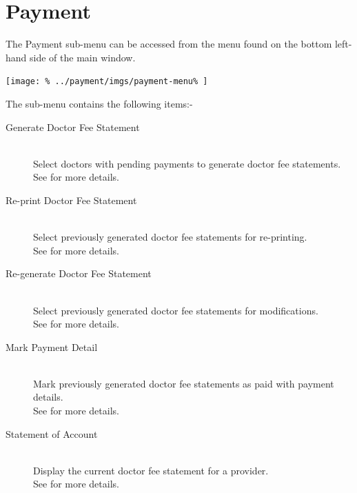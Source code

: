 \documentclass[../main/main]{subfiles}
\begin{document}
\newpage
\chapter{Payment}
The Payment sub-menu can be accessed from the menu found on the bottom
left-hand side of the main window.

\texttt{[image: \%
  ../payment/imgs/payment-menu\%
]}

The sub-menu contains the following items:-
\begin{description}
\item[Generate Doctor Fee Statement] \hfill \\
Select doctors with pending payments to generate doctor fee statements.\\
See  for more details.
\item[Re-print Doctor Fee Statement] \hfill \\
Select previously generated doctor fee statements for re-printing.\\
See  for more details.
\item[Re-generate Doctor Fee Statement] \hfill \\
Select previously generated doctor fee statements for modifications.\\
See  for more details.
\item[Mark Payment Detail] \hfill \\
Mark previously generated doctor fee statements as paid with payment details.\\
See  for more details.
\item[Statement of Account] \hfill \\
Display the current doctor fee statement for a provider.\\
See  for more details.
\end{description}






\end{document}
